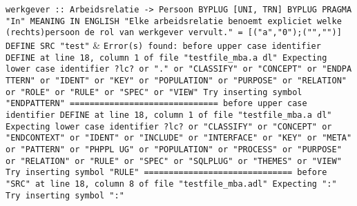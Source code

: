\texttt{werkgever :: Arbeidsrelatie -> Persoon \newline
  BYPLUG [UNI, TRN] BYPLUG\newline
  PRAGMA "In"\newline
  MEANING IN ENGLISH "Elke arbeidsrelatie benoemt expliciet welke (rechts)persoon de rol van werkgever vervult."\newline
  = [("a","0");("","")]\newline
  DEFINE SRC "test"} & \texttt{Error(s) found:\newline
  \newline
  before upper case identifier DEFINE at line 18, column 1 of file "testfile\_mba.a\newline
  dl"\newline
  Expecting lower case identifier ?lc? or "." or "CLASSIFY" or "CONCEPT" or "ENDPA\newline
  TTERN" or "IDENT" or "KEY" or "POPULATION" or "PURPOSE" or "RELATION" or "ROLE"\newline
  or "RULE" or "SPEC" or "VIEW"\newline
  Try inserting symbol "ENDPATTERN"\newline
  \newline
  ==============================\newline
  \newline
  before upper case identifier DEFINE at line 18, column 1 of file "testfile\_mba.a\newline
  dl"\newline
  Expecting lower case identifier ?lc? or "CLASSIFY" or "CONCEPT" or "ENDCONTEXT"\newline
  or "IDENT" or "INCLUDE" or "INTERFACE" or "KEY" or "META" or "PATTERN" or "PHPPL\newline
  UG" or "POPULATION" or "PROCESS" or "PURPOSE" or "RELATION" or "RULE" or "SPEC"\newline
  or "SQLPLUG" or "THEMES" or "VIEW"\newline
  Try inserting symbol "RULE"\newline
  \newline
  ==============================\newline
  \newline
  before "SRC" at line 18, column 8 of file "testfile\_mba.adl"\newline
  Expecting ":"\newline
  Try inserting symbol ":"\newline
  \newline
}
